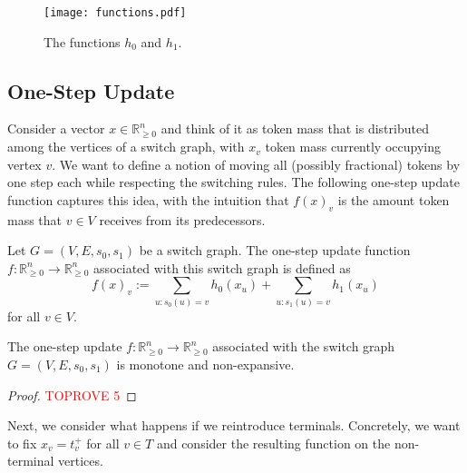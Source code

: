 \documentclass[a4paper,UKenglish,cleveref, autoref, thm-restate]{lipics-v2021}
\newcommand{\R}{\mathbb{R}}
\begin{document}
\begin{figure}[ht]
    \centering
    \texttt{[image: functions.pdf]}
    \caption{The functions $h_0$ and $h_1$.}
    \label{fig:enter-label}
\end{figure}

\subsection{One-Step Update}
\label{ssec:one-step_update}

Consider a vector $x \in \R^n_{\geq 0}$ and think of it as token mass that is distributed among the vertices of a switch graph, with $x_v$ token mass currently occupying vertex $v$. We want to define a notion of moving all (possibly fractional) tokens by one step each while respecting the switching rules. The following one-step update function captures this idea, with the intuition that $f(x)_v$ is the amount token mass that $v \in V$ receives from its predecessors.

\begin{definition}
    Let $G = (V, E, s_0, s_1)$ be a switch graph. The one-step update function $f : \R^{n}_{\geq 0} \rightarrow \R^{n}_{\geq 0}$ associated with this switch graph is defined as 
    \[
        f(x)_v := \sum_{u : s_0(u) = v} h_0(x_u) + \sum_{u : s_1(u) = v} h_1(x_u)
    \]
    for all $v \in V$.
\end{definition}

\begin{lemma}
\label{lemma:non-expansiveness_monotonicity}
    The one-step update $f : \R^n_{\geq 0} \rightarrow \R^n_{\geq 0}$ associated with the switch graph $G = (V, E, s_0, s_1)$ is monotone and non-expansive.
\end{lemma}
\begin{proof}\textcolor{red}{TOPROVE 5}\end{proof}
Next, we consider what happens if we reintroduce terminals. Concretely, we want to fix $x_v = t^+_v$ for all $v \in T$ and consider the resulting function on the non-terminal vertices.
\end{document}
